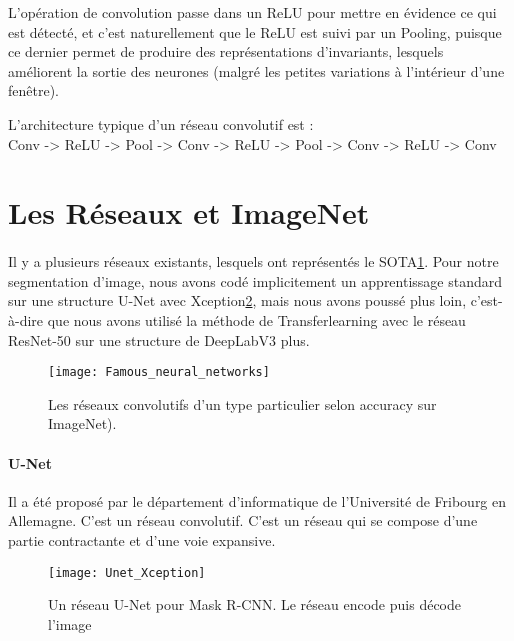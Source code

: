 \documentclass[
10pt,
a4paper, 
oneside, 
headinclude,footinclude, 
]{scrartcl}
\begin{document}
L’opération de convolution passe dans un \gls{ReLU} pour mettre en évidence ce qui est détecté, et c’est naturellement que le ReLU est suivi par un Pooling, puisque ce dernier permet de produire des représentations d’invariants, lesquels améliorent la sortie des neurones (malgré les petites variations à l’intérieur d’une fenêtre).

L’architecture typique d’un réseau convolutif est : \\
Conv -> ReLU -> Pool -> Conv -> ReLU -> Pool -> Conv -> ReLU -> Conv

\section{Les Réseaux et ImageNet}

\paragraph{}Il y a plusieurs réseaux existants, lesquels ont représentés le SOTA\ref{fig:Famous_neural_networks}. Pour notre segmentation d’image, nous avons codé implicitement un apprentissage standard sur une structure U-Net avec Xception\ref{fig:Unet_Xception}, mais nous avons poussé plus loin, c’est-à-dire que nous avons utilisé la méthode de \gls{Transferlearning} avec le réseau  ResNet-50 sur une structure de DeepLabV3 plus.
\begin{figure}[htb]
\centering 
\texttt{[image: Famous\_neural\_networks]} 
\caption[Les Réseaux Convolutifs sur ImageNet]{Les réseaux convolutifs d’un type particulier selon accuracy sur ImageNet).} 
\label{fig:Famous_neural_networks} 
\end{figure}

\paragraph{U-Net}
Il a été proposé par le département d’informatique de l’Université de Fribourg en Allemagne. C’est un réseau convolutif. C’est un réseau qui se compose d’une partie contractante et d’une voie expansive.
\begin{figure}[htb]
\centering 
\texttt{[image: Unet\_Xception]} 
\caption[U-Net]{Un réseau U-Net pour Mask R-CNN. Le réseau encode puis décode l’image} 
\label{fig:Unet_Xception} 
\end{figure}
\end{document}
